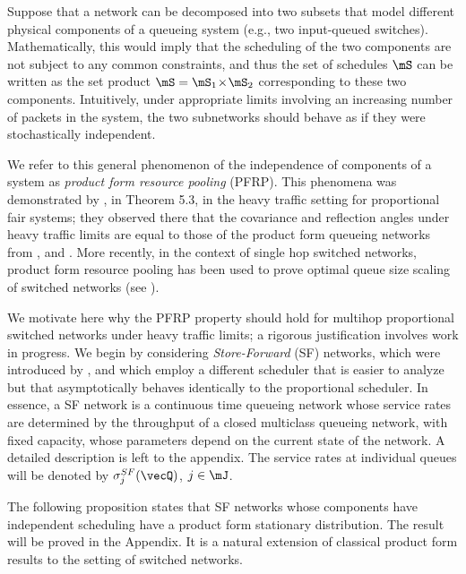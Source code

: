 \documentclass{amsart}
\begin{document}
Suppose that a network can be decomposed into two subsets that model different physical  components of a queueing system (e.g., two  input-queued switches). Mathematically, this would imply that the scheduling of the two components are not subject to any common constraints, and thus the set of schedules $\mS$ can be written as the set product $\mS= \mS_1\! \times\! \mS_2$ corresponding to these two components. Intuitively, 
under appropriate limits involving an increasing number of packets in the system, the two subnetworks should behave as if they were stochastically independent.

We refer to this general phenomenon of the independence of components of a system as \emph{product form resource pooling} (PFRP).  This phenomena was demonstrated by \cite{KKLW07i}, in Theorem 5.3, in the heavy traffic setting for proportional fair systems; they observed there that the covariance and reflection angles under heavy traffic limits are equal to those of the product form queueing networks from \cite{BoPr03}, and \cite{MaRo98}. More recently, in the context of single hop switched networks, product form resource pooling has been used to prove optimal queue size scaling of switched networks (see \cite{ShWaZh12}).

We motivate here why the PFRP property should hold for multihop proportional switched networks under heavy traffic limits; a rigorous justification involves work in progress.  We begin by considering \emph{Store-Forward} (SF) networks, 
which were introduced by  \cite{BoPr03}, and
which employ a different scheduler that is easier to analyze but that asymptotically behaves identically to the proportional scheduler.  
In essence, a SF network is a continuous time queueing network whose service rates are determined by the throughput of a closed multiclass queueing network, with fixed capacity, whose parameters depend on the current state of the network.
A detailed description is left to the appendix.  The service rates  at individual queues will be denoted by $\sigma_j^{SF}(\vecQ)$,  $j\in\mJ$.

The following proposition states that SF networks whose components have independent scheduling have a product form stationary distribution.  The result will be
proved in the Appendix.
It is a natural extension of classical product form results to the setting of switched networks. 
\end{document}
